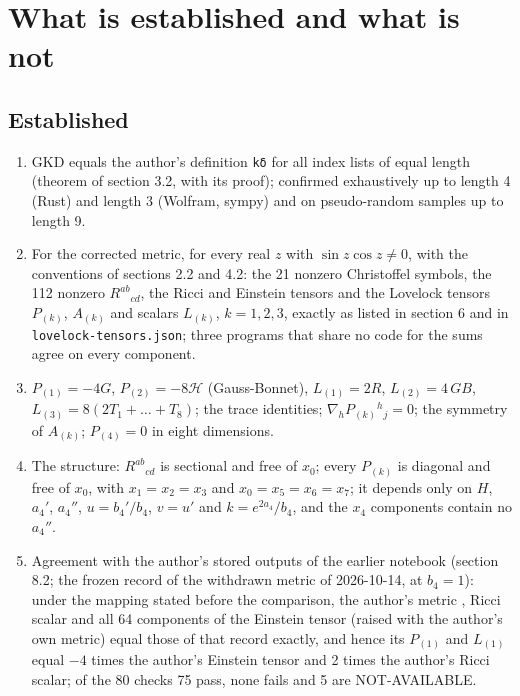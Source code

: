 \documentclass[11pt]{article}
\begin{document}
\section{What is established and what is not}

\subsection{Established}

\begin{enumerate}
\item GKD equals the author's definition \texttt{kδ} for all index lists of equal length (theorem of section 3.2, with its proof); confirmed exhaustively up to length 4 (Rust) and length 3 (Wolfram, sympy) and on pseudo-random samples up to length 9.
\item For the corrected metric, for every real $z$ with $\sin z\cos z \neq 0$, with the conventions of sections 2.2 and 4.2: the 21 nonzero Christoffel symbols, the 112 nonzero $R^{ab}{}_{cd}$, the Ricci and Einstein tensors and the Lovelock tensors $P_{(k)}$, $A_{(k)}$ and scalars $L_{(k)}$, $k = 1, 2, 3$, exactly as listed in section 6 and in \texttt{lovelock\allowbreak{}-tensors\allowbreak{}.json}; three programs that share no code for the sums agree on every component.
\item $P_{(1)} = -4G$, $P_{(2)} = -8\mathcal{H}$ (Gauss-Bonnet), $L_{(1)} = 2R$, $L_{(2)} = 4\,GB$, $L_{(3)} = 8(2T_1 + \dots + T_8)$; the trace identities; $\nabla_hP_{(k)}{}^h{}_j = 0$; the symmetry of $A_{(k)}$; $P_{(4)} = 0$ in eight dimensions.
\item The structure: $R^{ab}{}_{cd}$ is sectional and free of $x_0$; every $P_{(k)}$ is diagonal and free of $x_0$, with $x_1 = x_2 = x_3$ and $x_0 = x_5 = x_6 = x_7$; it depends only on $H$, $a_4'$, $a_4''$, $u = b_4'/b_4$, $v = u'$ and $k = e^{2a_4}/b_4$, and the $x_4$ components contain no $a_4''$.
\item Agreement with the author's stored outputs of the earlier notebook (section 8.2; the frozen record of the withdrawn metric of 2026-10-14, at $b_4 = 1$): under the mapping stated before the comparison, the author's metric \texttt{}, Ricci scalar \texttt{} and all 64 components of the Einstein tensor \texttt{} (raised with the author's own metric) equal those of that record exactly, and hence its $P_{(1)}$ and $L_{(1)}$ equal $-4$ times the author's Einstein tensor and 2 times the author's Ricci scalar; of the 80 checks 75 pass, none fails and 5 are NOT-AVAILABLE.
\end{enumerate}
\end{document}
